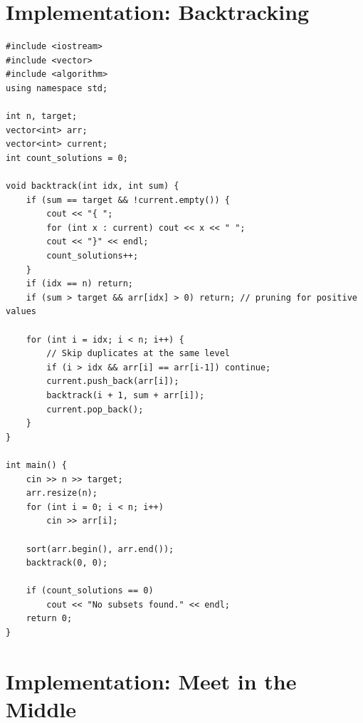 \documentclass[11pt,a4paper]{article}
\begin{document}
\section{Implementation: Backtracking}

\begin{lstlisting}
#include <iostream>
#include <vector>
#include <algorithm>
using namespace std;

int n, target;
vector<int> arr;
vector<int> current;
int count_solutions = 0;

void backtrack(int idx, int sum) {
    if (sum == target && !current.empty()) {
        cout << "{ ";
        for (int x : current) cout << x << " ";
        cout << "}" << endl;
        count_solutions++;
    }
    if (idx == n) return;
    if (sum > target && arr[idx] > 0) return; // pruning for positive values

    for (int i = idx; i < n; i++) {
        // Skip duplicates at the same level
        if (i > idx && arr[i] == arr[i-1]) continue;
        current.push_back(arr[i]);
        backtrack(i + 1, sum + arr[i]);
        current.pop_back();
    }
}

int main() {
    cin >> n >> target;
    arr.resize(n);
    for (int i = 0; i < n; i++)
        cin >> arr[i];

    sort(arr.begin(), arr.end());
    backtrack(0, 0);

    if (count_solutions == 0)
        cout << "No subsets found." << endl;
    return 0;
}
\end{lstlisting}

\section{Implementation: Meet in the Middle}
\end{document}
